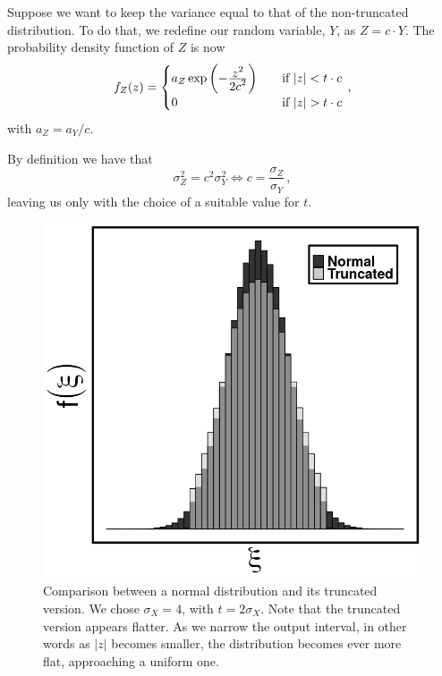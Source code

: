 \documentclass[../../main.tex]{subfiles}
\begin{document}
\begin{appendices}
    Suppose we want to keep the variance equal to that of the non-truncated distribution. To do that, we redefine our random variable, $Y$, as $Z = c \cdot Y$. The probability density function of $Z$ is now
        \begin{equation}\label{eq: Truncated Distribution - pdf trunc with correction}
            f_Z(z) =
            \begin{cases}
                a_Z\exp \left( -\frac{\displaystyle z^2}{\displaystyle 2c^2} \right) \quad &\text{if}\, \left| z \right| < t \cdot c \\
                0 \quad &\text{if}\, \left| z \right| > t \cdot c 
            \end{cases}
            \,,
        \end{equation}
    with $a_Z = a_Y/c$.
    
    By definition we have that 
        \begin{equation}\label{eq: Truncated Distribution - c}
            \sigma_Z^2 = c^2 \sigma_Y^2 \Leftrightarrow c = \frac{\sigma_Z}{\sigma_Y} \,,
        \end{equation}
    leaving us only with the choice of a suitable value for $t$.
    
        \begin{figure}
            \centering
            \includegraphics[scale=0.4]{Figures/truncated.png}
            \caption{Comparison between a normal distribution and its truncated version. We chose $\sigma_X = 4$, with $t = 2\sigma_X$. Note that the truncated version appears flatter. As we narrow the output interval, in other words as $\left| z \right|$ becomes smaller, the distribution becomes ever more flat, approaching a uniform one.}
            \label{fig: truncated dist}
        \end{figure}




\end{appendices}
\end{document}
